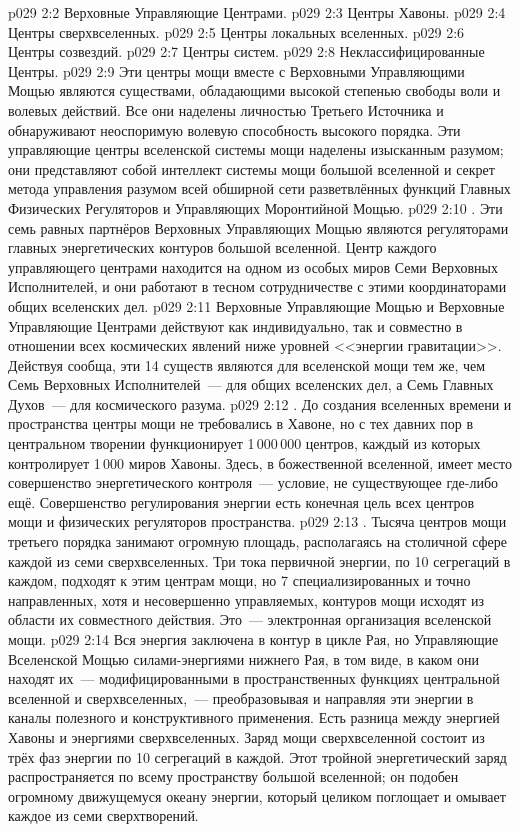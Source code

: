 \vs p029 2:2 Верховные Управляющие Центрами.
\vs p029 2:3 Центры Хавоны.
\vs p029 2:4 Центры сверхвселенных.
\vs p029 2:5 Центры локальных вселенных.
\vs p029 2:6 Центры созвездий.
\vs p029 2:7 Центры систем.
\vs p029 2:8 Неклассифицированные Центры.
\vs p029 2:9 \pc Эти центры мощи вместе с Верховными Управляющими Мощью являются существами, обладающими высокой степенью свободы воли и волевых действий. Все они наделены личностью Третьего Источника и обнаруживают неоспоримую волевую способность высокого порядка. Эти управляющие центры вселенской системы мощи наделены изысканным разумом; они представляют собой интеллект системы мощи большой вселенной и секрет метода управления разумом всей обширной сети разветвлённых функций Главных Физических Регуляторов и Управляющих Моронтийной Мощью.
\vs p029 2:10 . Эти семь равных партнёров Верховных Управляющих Мощью являются регуляторами главных энергетических контуров большой вселенной. Центр каждого управляющего центрами находится на одном из особых миров Семи Верховных Исполнителей, и они работают в тесном сотрудничестве с этими координаторами общих вселенских дел.
\vs p029 2:11 Верховные Управляющие Мощью и Верховные Управляющие Центрами действуют как индивидуально, так и совместно в отношении всех космических явлений ниже уровней <<энергии гравитации>>. Действуя сообща, эти 14 существ являются для вселенской мощи тем же, чем Семь Верховных Исполнителей~--- для общих вселенских дел, а Семь Главных Духов~--- для космического разума.
\vs p029 2:12 . До создания вселенных времени и пространства центры мощи не требовались в Хавоне, но с тех давних пор в центральном творении функционирует 1\,000\,000 центров, каждый из которых контролирует 1\,000 миров Хавоны. Здесь, в божественной вселенной, имеет место совершенство энергетического контроля~--- условие, не существующее где\hyp{}либо ещё. Совершенство регулирования энергии есть конечная цель всех центров мощи и физических регуляторов пространства.
\vs p029 2:13 . Тысяча центров мощи третьего порядка занимают огромную площадь, располагаясь на столичной сфере каждой из семи сверхвселенных. Три тока первичной энергии, по 10 сегрегаций в каждом, подходят к этим центрам мощи, но 7 специализированных и точно направленных, хотя и несовершенно управляемых, контуров мощи исходят из области их совместного действия. Это~--- электронная организация вселенской мощи.
\vs p029 2:14 Вся энергия заключена в контур в цикле Рая, но Управляющие Вселенской Мощью  силами\hyp{}энергиями нижнего Рая, в том виде, в каком они находят их~--- модифицированными в пространственных функциях центральной вселенной и сверхвселенных,~--- преобразовывая и направляя эти энергии в каналы полезного и конструктивного применения. Есть разница между энергией Хавоны и энергиями сверхвселенных. Заряд мощи сверхвселенной состоит из трёх фаз энергии по 10 сегрегаций в каждой. Этот тройной энергетический заряд распространяется по всему пространству большой вселенной; он подобен огромному движущемуся океану энергии, который целиком поглощает и омывает каждое из семи сверхтворений.

